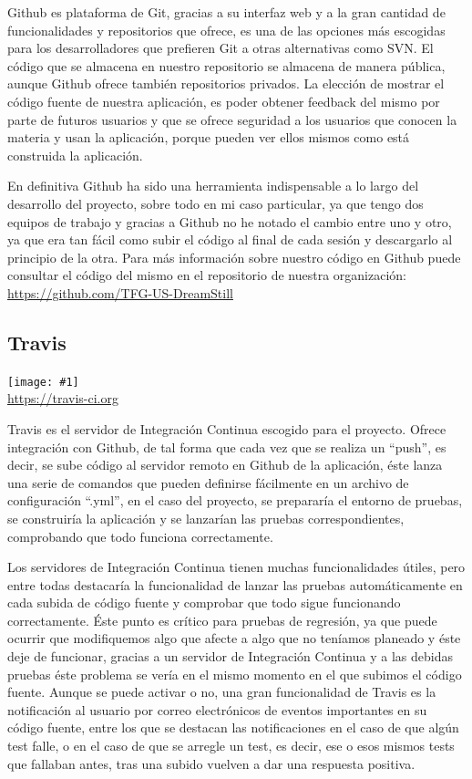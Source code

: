 \documentclass[11pt,openany]{book}
\newcommand{\logo}[2]{\medskip\begin{center}\texttt{[image: \#1]}\\\scriptsize\url{#2}\end{center}\bigskip}
\begin{document}
Github es plataforma de Git, gracias a su interfaz web y a la gran cantidad de funcionalidades y repositorios que ofrece, es una de las opciones más escogidas para los desarrolladores que prefieren Git a otras alternativas como SVN. El código que se almacena en nuestro repositorio se almacena de manera pública, aunque Github ofrece también repositorios privados. La elección de mostrar el código fuente de nuestra aplicación, es poder obtener feedback del mismo por parte de futuros usuarios y que se ofrece seguridad a los usuarios que conocen la materia y usan la aplicación, porque pueden ver ellos mismos como está construida la aplicación.

En definitiva Github ha sido una herramienta indispensable a lo largo del desarrollo del proyecto, sobre todo en mi caso particular, ya que tengo dos equipos de trabajo y gracias a Github no he notado el cambio entre uno y otro, ya que era tan fácil como subir el código al final de cada sesión y descargarlo al principio de la otra. Para más información sobre nuestro código en Github puede consultar el código del mismo en el repositorio de nuestra organización: \url{https://github.com/TFG-US-DreamStill}

\subsection{Travis}

\logo{logos/travis.png}{https://travis-ci.org}

Travis es el servidor de Integración Continua escogido para el proyecto. Ofrece integración con Github, de tal forma que cada vez que se realiza un ``push'', es decir, se sube código al servidor remoto en Github de la aplicación, éste lanza una serie de comandos que pueden definirse fácilmente en un archivo de configuración ``.yml''\cite{15}, en el caso del proyecto, se prepararía el entorno de pruebas, se construiría la aplicación y se lanzarían las pruebas correspondientes, comprobando que todo funciona correctamente.

Los servidores de Integración Continua tienen muchas funcionalidades útiles, pero entre todas destacaría la funcionalidad de lanzar las pruebas automáticamente en cada subida de código fuente y comprobar que todo sigue funcionando correctamente. Éste punto es crítico para pruebas de regresión, ya que puede ocurrir que modifiquemos algo que afecte a algo que no teníamos planeado y éste deje de funcionar, gracias a un servidor de Integración Continua y a las debidas pruebas éste problema se vería en el mismo momento en el que subimos el código fuente. Aunque se puede activar o no, una gran funcionalidad de Travis es la notificación al usuario por correo electrónicos de eventos importantes en su código fuente, entre los que se destacan las notificaciones en el caso de que algún test falle, o en el caso de que se arregle un test, es decir, ese o esos mismos tests que fallaban antes, tras una subido vuelven a dar una respuesta positiva.
\end{document}
